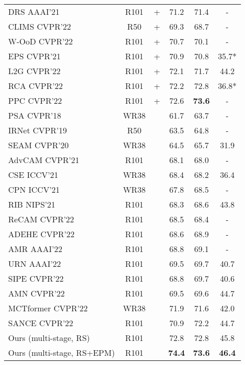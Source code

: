 \documentclass[11pt]{article}
\begin{document}
\begin{table}[t]
\begin{scriptsize}
\begin{tabular}{p{} c c c c c}
    DRS {\tiny AAAI'21} \cite{kim2021discriminative} & R101 & + & 71.2 & 71.4 & - \\
    CLIMS {\tiny CVPR'22} \cite{xie2022clims} & R50 & + & 69.3 & 68.7 & - \\
    W-OoD {\tiny CVPR'22} \cite{lee2022weakly} & R101 & + & 70.7 & 70.1 & - \\
    EPS {\tiny CVPR'21} \cite{lee2021railroad} & R101 & + & 70.9 & 70.8 & 35.7* \\
    L2G {\tiny CVPR'22} \cite{jiang2022l2g} & R101 & + & 72.1 & 71.7 & 44.2 \\
    RCA {\tiny CVPR'22} \cite{zhou2022regional} & R101 & + & 72.2 & 72.8 & 36.8* \\
    PPC {\tiny CVPR'22} \cite{du2022weakly} & R101 & + & 72.6 & \textbf{73.6} & - \\
    \hline
    PSA {\tiny CVPR'18} \cite{ahn2018learning} & WR38 &  & 61.7 & 63.7 & - \\
    IRNet {\tiny CVPR'19} \cite{ahn2019weakly} & R50 &  & 63.5 & 64.8 & - \\
SEAM {\tiny CVPR'20} \cite{wang2020self} & WR38 &  & 64.5 & 65.7 & 31.9 \\
AdvCAM {\tiny CVPR'21} \cite{lee2021anti} & R101 &  & 68.1 & 68.0 & - \\
    CSE {\tiny ICCV'21} \cite{kweon2021unlocking} & WR38 &  & 68.4 & 68.2 & 36.4 \\
    CPN {\tiny ICCV'21} \cite{zhang2021complementary} & WR38 &  & 67.8 & 68.5 & - \\
    RIB {\tiny NIPS'21} \cite{lee2021reducing} & R101 &  & 68.3 & 68.6 & 43.8 \\
    ReCAM {\tiny CVPR'22} \cite{chen2022class} & R101 &  & 68.5 & 68.4 & - \\
    ADEHE {\tiny CVPR'22} \cite{liu2022adaptive} & R101 &  & 68.6 & 68.9 & - \\
AMR {\tiny AAAI'22} \cite{qin2021activation} & R101 &  & 68.8 & 69.1 & - \\
    URN {\tiny AAAI'22} \cite{li2021uncertainty} & R101 &  & 69.5 & 69.7 & 40.7 \\ 
    SIPE {\tiny CVPR'22} \cite{chen2022self} & R101 &  & 68.8 & 69.7 & 40.6 \\
    AMN {\tiny CVPR'22} \cite{lee2022threshold} & R101 &  & 69.5 & 69.6 & 44.7 \\
    MCTformer {\tiny CVPR'22} \cite{xu2022multi} & WR38 &  & 71.9 & 71.6 & 42.0 \\
    SANCE {\tiny CVPR'22} \cite{li2022towards} & R101 &  & 70.9 & 72.2 & 44.7 \\
Ours (multi-stage, RS) & R101 &  & 72.8 & 72.8 & 45.8 \\ 
Ours (multi-stage, RS+EPM) & R101 &  & \textbf{74.4} & \textbf{73.6} & \textbf{46.4} \\
    \bottomrule
  \end{tabular} 
  \label{tab:comp_voc_coco}
  \end{scriptsize}
\end{table}
\end{document}
